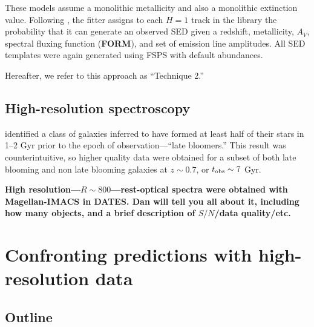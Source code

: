 \documentclass[a4paper,fleqn,usenatbib]{mnras}
\newcommand{\bfr}{\bf\color{red}}
\newcommand{\tobs}{t_{\rm obs}}
\begin{document}
These models assume a monolithic metallicity and also a monolithic extinction value. Following 
\citealt{Pacifici12}, the fitter assigns to each $H=1$ track in the library the probability that it can generate
an observed SED given a redshift, metallicity, $A_{V}$, spectral fluxing function ({\bfr FORM}), and 
set of emission line amplitudes. All SED templates were again generated using FSPS with default abundances.

Hereafter, we refer to this approach as ``Technique 2.''

\subsection{High-resolution spectroscopy}
\label{sec: hiRes}

\citet{Dressler16, Dressler18} identified a class of galaxies inferred to have formed at least half of 
their stars in 1--2 Gyr prior to the epoch of observation---``late bloomers.'' This result was counterintuitive, 
so higher quality data were obtained for a subset of both late blooming and non late blooming galaxies
at $z\sim0.7$, or $\tobs\sim7$ Gyr.

{\bfr High resolution---$R\sim800$---rest-optical spectra were obtained with Magellan-IMACS in DATES. 
Dan will tell you all about it, including how many objects, and a brief description of $S/N$/data quality/etc.}


\section{Confronting predictions with high-resolution data}
\label{sec:results}

\subsection{Outline}
\end{document}
